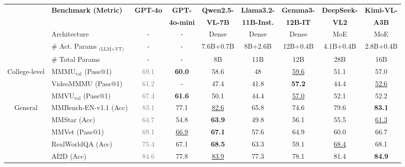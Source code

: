 \documentclass{article}
\newcommand{\gpto}[1]{\textcolor{gray}{#1}}
\begin{document}
\begin{table}[h!]
\renewcommand{\arraystretch}{1.4}

    \centering
    \footnotesize
    \setlength{\tabcolsep}{1.84pt}
    \begin{tabular}{@{}c l |  c c | c  c c | c c@{}}
    \toprule
    & \multirow{2}{*}{\centering \textbf{Benchmark {\tiny (Metric)}}}  & \multirow{2}{*}{\textbf{GPT-4o}} & \textbf{GPT-} & \textbf{Qwen2.5-} & \textbf{Llama3.2-} & \textbf{Gemma3-}  & \textbf{DeepSeek-}   & \textbf{Kimi-VL-} \\
    & &  & \textbf{4o-mini}  & \textbf{VL-7B} & \textbf{11B-Inst.} & \textbf{12B-IT} & \textbf{VL2}  & \textbf{A3B} \\
    \midrule
    & Architecture  & - & - & Dense & Dense & Dense & MoE & MoE \\
    & \# Act. Params $_\text{(LLM+VT)}$  & - & - & 7.6B+0.7B & 8B+2.6B & 12B+0.4B & 4.1B+0.4B & 2.8B+0.4B \\
    & \# Total Params  & -& - & 8B & 11B & 12B & 28B & 16B \\
    \midrule
    
    \multirow{3}{66pt}{College-level}
    & MMMU$_{\text{val}}$ {\tiny (Pass@1)}  & \gpto{69.1} & \textbf{60.0} & 58.6 & 48 & \underline{59.6} &  51.1 &  {57.0} \\
    & VideoMMMU {\tiny (Pass@1)}  &  \gpto{61.2} &  - & 47.4  & 41.8  & \textbf{57.2}  & 44.4  & \underline{52.6} \\
    & MMVU$_{\text{val}}$ {\tiny (Pass@1)}   & \gpto{67.4}  & \textbf{61.6}  &   50.1 & 44.4  & \underline{57.0} &  52.1 & {52.2} \\
    \midrule
    
    \multirow{5}{66pt}{General}
    & MMBench-EN-v1.1 {\tiny (Acc)}  & \gpto{83.1} & 77.1 & \underline{82.6} & 65.8 & 74.6 & 79.6 &  \textbf{83.1} \\
    & MMStar {\tiny (Acc)}  & \gpto{64.7} & 54.8 & \textbf{63.9} & 49.8 & 56.1 & 55.5 &  \underline{61.3} \\
    & MMVet {\tiny (Pass@1)}   & \gpto{69.1} & \underline{66.9} & \textbf{67.1} & 57.6 & 64.9 & 60.0 &  {66.7}  \\
    & RealWorldQA {\tiny (Acc)}  & \gpto{75.4} & 67.1 & \textbf{68.5} & 63.3 & 59.1 & \underline{68.4} &  {68.1}  \\
    & AI2D {\tiny (Acc)}  & \gpto{84.6} & 77.8 & \underline{83.9} & 77.3 & 78.1 & 81.4 &   \textbf{84.9}  \\
    \midrule
    

\end{tabular}
\end{table}
\end{document}
